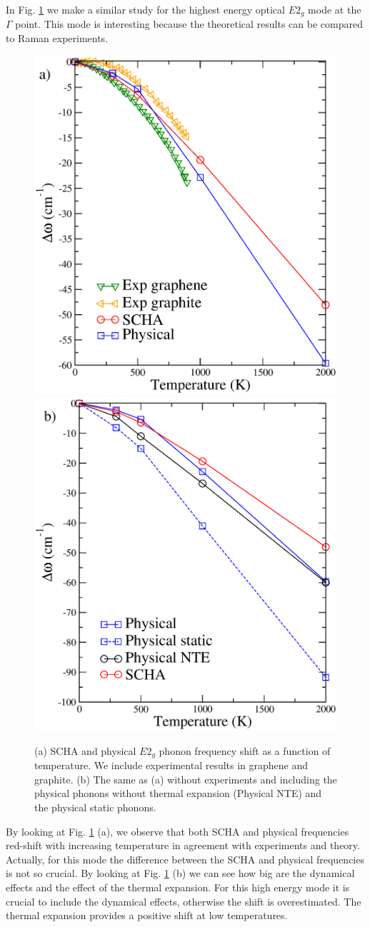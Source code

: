 In Fig. \ref{e2g} we make a similar study for the highest energy optical $E2_{g}$ mode at the $\Gamma$ point. This 
mode is interesting because the theoretical results can be compared to Raman experiments\cite{linas2015interplay}. 
\begin{figure}[ht]
\includegraphics[width=0.49\linewidth]{Figures/e2g1.eps}
\includegraphics[width=0.49\linewidth]{Figures/e2g2.eps}
	\caption[E2g mode temperature dependent frequency shift]{(a) SCHA and physical $E2_{g}$ phonon frequency 
	shift as a function of temperature. We include experimental results in graphene\cite{linas2015interplay} and 
	graphite\cite{kagi1994proper,tan1999intrinsic}. (b) The same as (a) without experiments and including the 
	physical phonons without thermal expansion (Physical NTE) and the physical static phonons.}
\label{e2g}
\end{figure}
By looking at Fig. \ref{e2g} (a), we observe that both SCHA and physical frequencies red-shift with increasing 
temperature in agreement with experiments and theory\cite{calizo2007temperature,bonini2007phonon}. Actually, for 
this mode the difference between the SCHA and physical frequencies is not so crucial. By looking at Fig. \ref{e2g} 
(b) we can see how big are the dynamical effects and the effect of the thermal expansion. For this high energy mode 
it is crucial to include the dynamical effects, otherwise the shift is overestimated. The thermal expansion provides 
a positive shift at low temperatures. 

